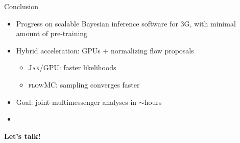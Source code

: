 \documentclass[usenames,dvipsnames,t]{beamer}
\begin{document}
\begin{frame}{Conclusion}
  \def\x{4mm}
  \def\y{1mm}

  \begin{itemize}
    \item Progress on scalable Bayesian inference software for 3G, with minimal amount of pre-training

    \vspace{\x}

    \item Hybrid acceleration: GPUs + normalizing flow proposals
    \begin{itemize}
      \vspace{\y}
      \item \textsc{Jax}/GPU: faster likelihoods

      \vspace{\y}

      \item \textsc{flowMC}: sampling converges faster
    \end{itemize}

    \vspace{\x}

    \item Goal: joint multimessenger analyses in $\sim$hours

    \vspace{\x}

    \vspace{\y}

    \item {}
  \end{itemize}
  
  \vspace{4mm}

  \textbf{Let's talk!}
\end{frame}
\end{document}
